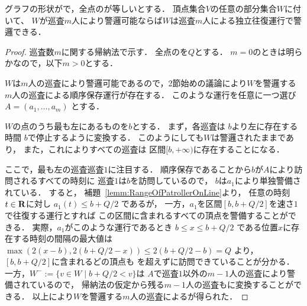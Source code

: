 \begin{lemm}
\label{lemm:LineEqualTimelimitIndependentInterval}
グラフの形状が{\graphLine}で，全点の{\maxIdletime}が等しいとする．
頂点集合$V$の任意の部分集合$W$に付いて、
$W$が巡査$m$人により警邏可能ならば$W$は巡査$m$人による独立往復運行で警邏できる．
\end{lemm}
\begin{proof}
\newcommand{\leftmostpoint}{b}  %
\newcommand{\newpatroller}{l}
\newcommand{\leftmostpatroller}{巡査1}
\newcommand{\leftmostpatOpr}{a_1}

巡査数$m$に関する帰納法で示す．
全点の{\maxIdletime}を$Q$とする．
$m = 0$のときは明らかなので，以下$m > 0$とする．

$W$は$m$人の巡査により警邏可能であるので，2節始めの議論により$W$を警邏する$m$人の巡査による順序保存運行が存在する．
このような運行を任意に一つ選び
$A = (a _1, \ldots, a _m)$
とする．

$W$の点のうち最も左にあるものを$\leftmostpoint$とする．
まず，各巡査は
$\leftmostpoint$より左に存在する時間
$\leftmostpoint$で停止するように変換する．
このようにしても$W$は警邏されたままであり，
また，これによりすべての巡査は
区間$[\leftmostpoint, +\infty)$に存在することになる．

ここで，最も左の巡査$\leftmostpatroller$に注目する．
順序保存であることから$\leftmostpoint$が$A$により訪問されるすべての時刻に
$\leftmostpatroller$は$\leftmostpoint$を訪問しているので，
$\leftmostpoint$は$\leftmostpatOpr$により単独警備されている．
%
すると，
補題~\ref{lemm:RangeOfPatrollerOnLine}より，
任意の時刻$t \in \mathbf R$に対し
$\leftmostpatOpr(t) \leq \leftmostpoint + Q/2$
であるが，
%
一方，$\leftmostpatOpr$を区間$[b, b + Q/2]$を速さ$1$で往復する運行とすれば
この区間に含まれるすべての頂点を警備することができる．
実際，$\leftmostpatOpr$がこのような運行であるとき
$\leftmostpoint \leq x \leq \leftmostpoint + Q/2$
である位置$x$に存在する時刻の間隔の最大値は
$ \max( 2(x - \leftmostpoint), 2(\leftmostpoint + Q/2 - x) )
  \leq 2(\leftmostpoint + Q/2 - \leftmostpoint) = Q $
より，$[\leftmostpoint, \leftmostpoint + Q/2]$に含まれるどの頂点も
{\maxIdletime}を超えずに訪問できていることが分かる．
%
一方，$W^- := \{ v \in W \mid \leftmostpoint + Q/2 < v \}$は
$A$で$\leftmostpatroller$以外の$m - 1$人の巡査により警備されているので，
帰納法の仮定から残る$m - 1$人の巡査も{\indSectOperation}に変換することができる．
以上により$W$を警邏する$m$人の巡査による{\indSectOperation}が得られた．
\end{proof}


